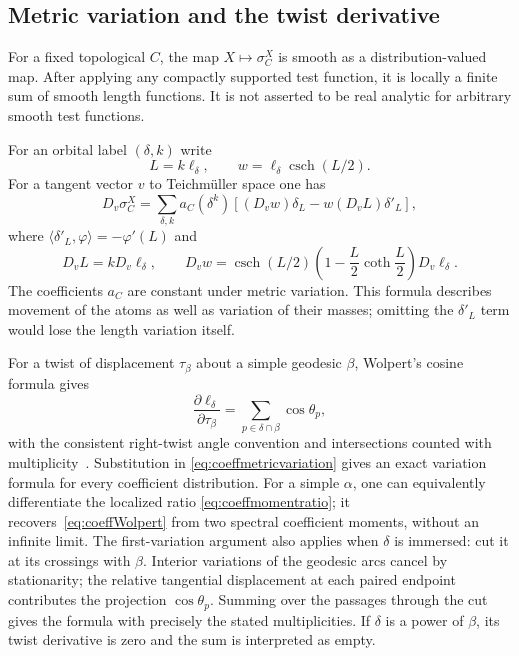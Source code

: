 \subsection{Metric variation and the twist derivative}

For a fixed topological $C$, the map
$X\mapsto\sigma_C^X$ is smooth as a distribution-valued map.
After applying any compactly supported test function, it is locally
a finite sum of smooth length functions. It is not asserted to be
real analytic for arbitrary smooth test functions.

For an orbital label $(\delta,k)$ write
\[
 L=k\ell_\delta,\qquad
 w=\ell_\delta\operatorname{csch}(L/2).
\]
For a tangent vector $v$ to Teichm\"uller space one has
\begin{equation}
 D_v\sigma_C^X
 =\sum_{\delta,k}a_C(\delta^k)
  \left[(D_vw)\delta_L-w(D_vL)\delta'_L\right],
 \label{eq:coeffmetricvariation}
\end{equation}
where $\langle\delta'_L,\varphi\rangle=-\varphi'(L)$ and
\[
 D_vL=kD_v\ell_\delta,\qquad
 D_vw=\operatorname{csch}(L/2)
       \left(1-\frac L2\coth\frac L2\right)D_v\ell_\delta.
\]
The coefficients $a_C$ are constant under metric variation. This
formula describes movement of the atoms as well as variation of
their masses; omitting the $\delta'_L$ term would lose the length
variation itself.

For a twist of displacement $\tau_\beta$ about a simple geodesic
$\beta$, Wolpert's cosine formula gives
\begin{equation}
 \frac{\partial\ell_\delta}{\partial\tau_\beta}
 =\sum_{p\in\delta\cap\beta}\cos\theta_p,
 \label{eq:coeffWolpert}
\end{equation}
with the consistent right-twist angle convention and intersections
counted with multiplicity~\cite{WolpertTwist}. Substitution in
\eqref{eq:coeffmetricvariation} gives an exact variation formula
for every coefficient distribution. For a simple $\alpha$, one
can equivalently differentiate the localized ratio
\eqref{eq:coeffmomentratio}; it recovers~\eqref{eq:coeffWolpert}
from two spectral coefficient moments, without an infinite limit.
The first-variation argument also applies when $\delta$ is immersed:
cut it at its crossings with $\beta$. Interior variations of the
geodesic arcs cancel by stationarity; the relative tangential
displacement at each paired endpoint contributes the projection
$\cos\theta_p$. Summing over the passages through the cut gives
the formula with precisely the stated multiplicities. If $\delta$
is a power of $\beta$, its twist derivative is zero and the sum is
interpreted as empty.

